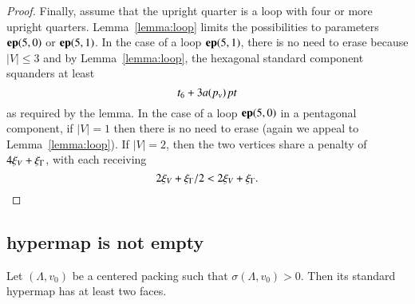 \begin{proof}
Finally, assume that the upright quarter is a loop with four or
more upright quarters.  Lemma~\ref{lemma:loop} limits the
possibilities to parameters ${\operatorname{\bf ep}}{(5,0)}$ or ${\operatorname{\bf ep}}{(5,1)}$.  In the case of a
loop ${\operatorname{\bf ep}}{(5,1)}$, there is no need to erase because $|V|\le3$ and by
Lemma~\ref{lemma:loop}, the hexagonal standard component squanders at
least
   $$t_6 + 3 a(p_v)\,\hbox{\it pt}$$
as required by the lemma.  In the case of a loop ${\operatorname{\bf ep}}{(5,0)}$ in a
pentagonal component, if $|V|=1$ then there is no need to erase
(again we appeal to Lemma~\ref{lemma:loop}).  If $|V| =2$, then
the two vertices share a penalty of $4\xi_V + \xi_\Gamma$, with each
receiving
   $$2\xi_V + \xi_\Gamma/2 < 2\xi_V +\xi_\Gamma.$$
\end{proof}












\subsection{hypermap is not empty}




\begin{lemma}\label{prop:nonempty} 
Let $(\Lambda,v_0)$ be a centered packing such that $\sigma(\Lambda,v_0)>0$.
Then its standard hypermap has at least two faces.
\end{lemma}

